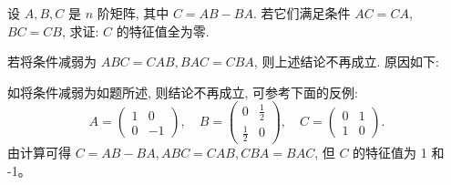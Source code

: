 \documentclass[../../main.tex]{subfiles}%
\begin{document}
\begin{proposition}\label{proposition:经典矩阵乘法可交换诱导的性质例题}
设 \(A, B, C\) 是 \(n\) 阶矩阵, 其中 \(C = AB - BA\). 若它们满足条件 $AC = CA$, $BC = CB$, 求证: \(C\) 的特征值全为零.
\end{proposition}
\begin{remark}
若将条件减弱为 \(ABC = CAB, BAC = CBA\), 则上述结论不再成立. 原因如下:

如将条件减弱为如题所述, 则结论不再成立, 可参考下面的反例:
\[
A = \begin{pmatrix}
1 & 0 \\ 
0 & -1
\end{pmatrix}, \quad
B = \begin{pmatrix}
0 & \frac{1}{2} \\ 
\frac{1}{2} & 0
\end{pmatrix}, \quad
C = \begin{pmatrix}
0 & 1 \\ 
1 & 0
\end{pmatrix}.
\]
由计算可得 \(C = AB - BA, ABC = CAB, CBA = BAC\), 但 \(C\) 的特征值为 1 和 -1。
\end{remark}
\end{document}
